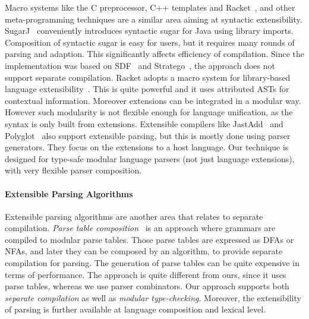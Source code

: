 Macro systems like the C preprocessor, C++ templates and
Racket~\cite{Tobin-Hochstadt2011}, and other meta-programming
techniques are a similar area aiming at syntactic extensibility.
SugarJ~\cite{Erdweg2011} conveniently introduces syntactic sugar for
Java using library imports. Composition of syntactic sugar is easy for
users, but it requires many rounds of parsing and adaption. This
significantly affects efficiency of compilation. Since the
implementation was based on SDF~\cite{Heering1989} and
Stratego~\cite{Visser2001}, the approach does not support separate
compilation. Racket adopts a macro system for library-based language
extensibility~\cite{Tobin-Hochstadt2011}. This is quite powerful and it uses
attributed ASTs for contextual
information. Moreover extensions can be integrated in a modular
way. However such modularity is not flexible enough for language
unification, as the syntax is only built from extensions.
Extensible
compilers like JastAdd~\cite{Ekman2007} and
Polyglot~\cite{Nystrom2003} also support extensible parsing, but this
is mostly done using parser generators. They focus on the
extensions to a host language. Our technique is designed for type-safe
modular language parsers (not just language
extensions), with very flexible parser composition.


\paragraph{Extensible Parsing Algorithms}
Extensible parsing algorithms are another area that relates to
separate compilation.
\textit{Parse table composition}~\cite{bravenboer2008parse}
is an approach where grammars are compiled to
modular parse tables. Those parse tables are expressed as DFAs
or NFAs, and later they can be composed by an algorithm, to provide
separate compilation for parsing. The generation of parse tables can
be quite expensive in terms of performance. The approach
is quite different from ours, since it uses parse
 tables, whereas we use parser combinators.
Our approach supports both
\emph{separate compilation} as well as \emph{modular
  type-checking}. Moreover, the extensibility of parsing is further
available at language composition and lexical level.

